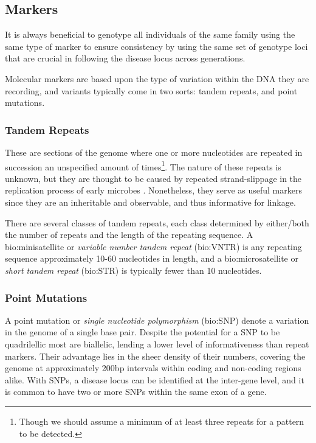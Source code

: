 \subsection{Markers}
It is always beneficial to genotype all individuals of the same family using the same type of marker to ensure consistency by using the same set of genotype loci that are crucial in following the disease locus across generations.

Molecular markers are based upon the type of variation within the DNA they are recording, and variants typically come in two sorts: tandem repeats, and point mutations.

\subsubsection{Tandem Repeats}

These are sections of the genome where one or more nucleotides are repeated in succession an unspecified amount of times\footnote{Though we should assume a minimum of at least three repeats for a pattern to be detected.}. The nature of these repeats is unknown, but they are thought to be caused by repeated strand-slippage in the replication process of early microbes \cite{saeed_microsatellites_2015}.   Nonetheless, they serve as useful markers since they are an inheritable and observable, and thus informative for linkage.

There are several classes of tandem repeats, each class determined by either/both the number of repeats and the length of the repeating sequence. A \gls{bio:minisatellite} or \textit{variable number tandem repeat} (\gls{bio:VNTR}) is any repeating sequence approximately 10-60 nucleotides in length, and a \gls{bio:microsatellite} or \textit{short tandem repeat} (\gls{bio:STR}) is typically fewer than 10 nucleotides.

\subsubsection{Point Mutations}

A point mutation or \textit{single nucleotide polymorphism} (\gls{bio:SNP}) denote a variation in the genome of a single base pair. Despite the potential for a SNP to be quadrilellic most are biallelic, lending a lower  level of informativeness than repeat markers. Their advantage lies in the sheer density of their numbers, covering the genome at approximately 200bp intervals within coding and non-coding regions alike. With SNPs, a disease locus can be identified at the inter-gene level, and it is common to have two or more SNPs within the same exon of a gene. 

